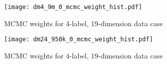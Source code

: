 

\begin{figure}[H]
    \centerline{\texttt{[image: dm4\_9m\_0\_mcmc\_weight\_hist.pdf]}}
    \caption{MCMC weights for 4-label, 19-dimension data case }
    \label{fig:4l-mcmc_weights}
\end{figure}

\begin{figure}[H]
    \centerline{\texttt{[image: dm24\_950k\_0\_mcmc\_weight\_hist.pdf]}}
    \caption{MCMC weights for 4-label, 19-dimension data case }
    \label{fig:24l-mcmc_weights}
\end{figure}

